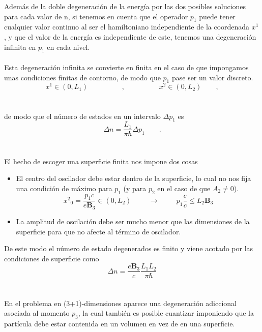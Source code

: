 \documentclass[11pt,letterpaper]{article}     %
\begin{document}
Además de la doble degeneración de la energía por las dos posibles soluciones para cada valor de n, si tenemos en cuenta que el operador $p_1$ puede tener cualquier valor continuo al ser el hamiltoniano independiente de la coordenada $x^1$, y que el valor de la energía es independiente de este, tenemos una degeneración infinita en $p_1$ en cada nivel. \\ \\
Esta degeneración infinita se convierte en finita en el caso de que impongamos unas condiciones finitas de contorno, de modo que $p_1$ pase ser un valor discreto.
\begin{equation}\label{eq:155}
x^1 \in (0,L_1) \hspace{2cm}, \hspace{2cm} x^2 \in (0,L_2) \qquad ,
\end{equation} \\ \\
de modo que el número de estados en un intervalo $\Delta p_1$ es
\begin{equation}\label{eq:156}
\Delta n = \frac{L_1}{\pi \hbar} \Delta p_1 \qquad .
\end{equation} \\ \\
El hecho de escoger una superficie finita nos impone dos cosas
\begin{itemize}
\item El centro del oscilador debe estar dentro de la superficie, lo cual no nos fija una condición de máximo para $p_1$ (y para $p_2$ en el caso de que $A_2 \neq 0$).
\begin{equation}\label{eq:157}
{x^2}_0=\frac{p_1 c}{e \textbf{B}_3} \in (0,L_2) \hspace{1cm} \rightarrow \hspace{1cm} p_1 \frac{e}{c} \leq L_2 \textbf{B}_3 
\end{equation}
\item La amplitud de oscilación debe ser mucho menor que las dimensiones de la superficie para que no afecte al término de oscilador.
\end{itemize}
De este modo el número de estado degenerados es finito y viene acotado por las condiciones de superficie como \\
\begin{equation}\label{eq:158}
\Delta n = \frac{e \textbf{B}_3}{c} \frac{L_1 L_2}{\pi \hbar}
\end{equation} \\ \\
En el problema en (3+1)-dimensiones aparece una degeneración adiccional asociada al momento $p_3$, la cual también es posible cuantizar imponiendo que la partícula debe estar contenida en un volumen en vez de en una superficie.
\end{document}
